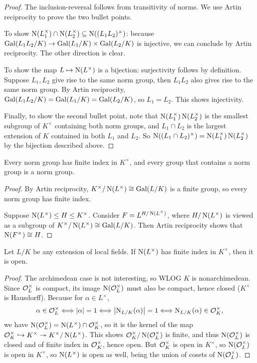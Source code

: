 \documentclass[11pt]{amsart}
\begin{document}
\begin{proof}
    The inclusion-reversal follows from transitivity of norms. We use Artin reciprocity to prove the two bullet points.

    To show $\operatorname{N}(L_1^\times) \cap \operatorname{N}(L_2^\times) \subseteq \operatorname{N}((L_1L_2)^\times)$: because $\operatorname{Gal}(L_1L_2/K) \to \operatorname{Gal}(L_1/K)\times \operatorname{Gal}(L_2/K)$ is injective, we can conclude by Artin reciprocity. The other direction is clear.

    To show the map $L\mapsto \operatorname{N}(L^\times)$ is a bijection: surjectivity follows by definition. Suppose $L_1,L_2$ give rise to the same norm group, then $L_1L_2$ also gives rise to the same norm group. By Artin reciprocity, $\operatorname{Gal}(L_1L_2/K) = \operatorname{Gal}(L_1/K) = \operatorname{Gal}(L_2/K)$, so $L_1=L_2$. This shows injectivity.

    Finally, to show the second bullet point, note that $\operatorname{N}(L_1^\times)\operatorname{N}(L_2^\times)$ is the smallest subgroup of $K^\times$ containing both norm groups, and $L_1\cap L_2$ is the largest extension of $K$ contained in both $L_1$ and $L_2$. So $\operatorname{N}((L_1\cap L_2)^\times) = \operatorname{N}(L_1^\times)\operatorname{N}(L_2^\times)$ by the bijection described above.
\end{proof}

\begin{cor}
    Every norm group has finite index in $K^\times$, and every group that contains a norm group is a norm group.
\end{cor}

\begin{proof}
    By Artin reciprocity, $K^\times/\operatorname{N}(L^\times) \cong \operatorname{Gal}(L/K)$ is a finite group, so every norm group has finite index. 

    Suppose $\operatorname{N}(L^\times) \le H \le K^\times$. Consider $F = L^{H/\operatorname{N}(L^\times)}$, where $H/\operatorname{N}(L^\times)$ is viewed as a subgroup of $K^\times/\operatorname{N}(L^\times) \cong \operatorname{Gal}(L/K)$. Then Artin reciprocity shows that $\operatorname{N}(F^\times) \cong H$. 
\end{proof}

\begin{lem}
\label{finite_index_open}
    Let $L/K$ be any extension of local fields. If $\operatorname{N}(L^\times)$ has finite index in $K^\times$, then it is open.
\end{lem}

\begin{proof}
    The archimedean case is not interesting, so WLOG $K$ is nonarchimedean. Since $\mathcal{O}_L^\times$ is compact, its image $\operatorname{N}(\mathcal{O}_L^\times)$ must also be compact, hence closed ($K^\times$ is Hausdorff). Because for $\alpha\in L^\times$,
    \[\alpha\in \mathcal{O}_L^\times \Longleftrightarrow \left | \alpha \right | = 1 \Longleftrightarrow \left | \operatorname{N}_{L/K}(\alpha) \right | = 1 \Longleftrightarrow \operatorname{N}_{L/K}(\alpha)\in\mathcal{O}_K^\times,\]
    we have $\operatorname{N}(\mathcal{O}_L^\times) = \operatorname{N}(L^\times)\cap \mathcal{O}_K^\times$, so it is the kernel of the map $\mathcal{O}_K^\times\hookrightarrow K^\times\twoheadrightarrow K^\times/\operatorname{N}(L^\times)$. This shows $\mathcal{O}_K^\times/\operatorname{N}(\mathcal{O}_L^\times)$ is finite, and thus $\operatorname{N}(\mathcal{O}_L^\times)$ is closed and of finite index in $\mathcal{O}_K^\times$, hence open. But $\mathcal{O}_K^\times$ is open in $K^\times$, so $\operatorname{N}(\mathcal{O}_L^\times)$ is open in $K^\times$, so $\operatorname{N}(L^\times)$ is open as well, being the union of cosets of $\operatorname{N}(\mathcal{O}_L^\times)$.
\end{proof}
\end{document}
